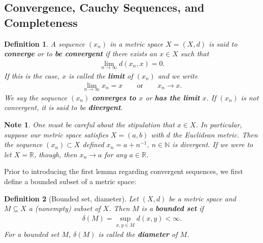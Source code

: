 \documentclass[11pt]{article}
\theoremstyle{mystyle}
\newtheorem{defn}{Definition}[section]
\newtheorem{note}{Note}[section]
\begin{document}
\subsection{Convergence, Cauchy Sequences, and Completeness}

\begin{defn}
A sequence $(x_n)$ in a metric space $X=(X,d)$ is said to \textbf{converge} or to \textbf{be convergent} if there exists an $x \in X$ such that
\begin{align*}
    \lim_{n \to \infty} d(x_n, x) = 0.
\end{align*}
If this is the case, $x$ is called the \textbf{limit} of $(x_n)$ and we write \begin{align*}
    \lim_{n \to \infty} x_n = x \qquad \text{or} \qquad x_n \longrightarrow x.
\end{align*} 
We say the sequence $(x_n)$ \textbf{converges to $x$} or \textbf{has the limit} $x$. If $(x_n)$ is not convergent, it is said to be \textbf{divergent}.
\end{defn}

\begin{note}\label{notecompleteness}
One must be careful about the stipulation that $x \in X$. In particular, suppose our metric space satisfies $X = (a, b)$ with $d$ the Euclidean metric. Then the sequence $(x_n) \subset X$ defined $x_n = a + n^{-1}, \ n \in \mathbb{N}$ is divergent. If we were to let $X = \mathbb{R}$, though, then $x_n \longrightarrow a$ for any $a \in \mathbb{R}$.
\end{note}

Prior to introducing the first lemma regarding convergent sequences, we first define a bounded subset of a metric space:
\begin{defn}[Bounded set, diameter]
Let $(X, d)$ be a metric space and $M \subseteq X$ a (nonempty) subset of $X$. Then $M$ is a \textbf{bounded set} if
\begin{align*}
    \delta(M) = \sup_{x, y \in M}d(x, y) < \infty.
\end{align*}
For a bounded set $M$, $\delta(M)$ is called the \textbf{diameter} of $M$.
\end{defn}
\end{document}
